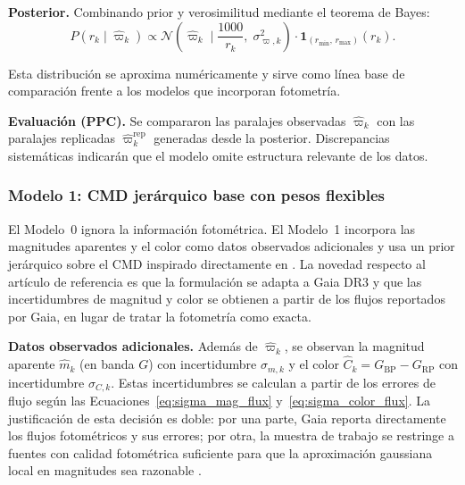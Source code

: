 \documentclass[stu, 12pt, letterpaper, donotrepeattitle, floatsintext, natbib]{apa7_ula}
\begin{document}
\textbf{Posterior.}
Combinando prior y verosimilitud mediante el teorema de Bayes:
\begin{equation}
    P(r_k \mid \hat{\varpi}_k) \propto
    \mathcal{N}\!\left(\hat{\varpi}_k \;\Big|\;
    \frac{1000}{r_k},\; \sigma_{\varpi,k}^2\right)
    \cdot \mathbf{1}_{(r_{\min},\, r_{\max})}(r_k).
    \label{eq:m0_post}
\end{equation}

Esta distribución se aproxima numéricamente y sirve como línea base de
comparación frente a los modelos que incorporan fotometría.

\textbf{Evaluación (PPC).}
Se compararon las paralajes observadas $\hat{\varpi}_k$ con las
paralajes replicadas $\hat{\varpi}_k^{\text{rep}}$ generadas desde la
posterior. Discrepancias sistemáticas indicarán que el modelo omite
estructura relevante de los datos.

\subsubsection{Modelo 1: CMD jerárquico base con pesos flexibles}

El Modelo~0 ignora la información fotométrica. El Modelo~1 incorpora
las magnitudes aparentes y el color como datos observados adicionales y
usa un prior jerárquico sobre el CMD inspirado directamente en
\citet{Leistedt_2017}. La novedad respecto al artículo de referencia es
que la formulación se adapta a Gaia DR3 y que las incertidumbres de
magnitud y color se obtienen a partir de los flujos reportados por
Gaia, en lugar de tratar la fotometría como exacta.

\textbf{Datos observados adicionales.}
Además de $\hat{\varpi}_k$, se observan la magnitud aparente
$\hat{m}_k$ (en banda $G$) con incertidumbre $\sigma_{m,k}$
y el color $\hat{C}_k = G_{\text{BP}} - G_{\text{RP}}$ con
incertidumbre $\sigma_{C,k}$. Estas incertidumbres se calculan a partir
de los errores de flujo según las Ecuaciones~\ref{eq:sigma_mag_flux}
y~\ref{eq:sigma_color_flux}. La justificación de esta decisión es
doble: por una parte, Gaia reporta directamente los flujos fotométricos y sus errores;
por otra, la muestra de trabajo se restringe a fuentes con calidad
fotométrica suficiente para que la aproximación gaussiana local en
magnitudes sea razonable \citep{2021AJ....161..147B, Cox_Donnelly_2011}.
\end{document}
